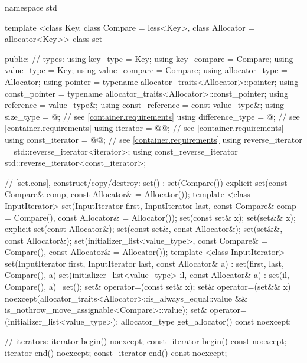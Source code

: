 \begin{codeblock}
namespace std {
  template <class Key, class Compare = less<Key>,
            class Allocator = allocator<Key>>
  class set {
  public:
    // types:
    using key_type               = Key;
    using key_compare            = Compare;
    using value_type             = Key;
    using value_compare          = Compare;
    using allocator_type         = Allocator;
    using pointer                = typename allocator_traits<Allocator>::pointer;
    using const_pointer          = typename allocator_traits<Allocator>::const_pointer;
    using reference              = value_type&;
    using const_reference        = const value_type&;
    using size_type              = @\impdef@; // see \ref{container.requirements}
    using difference_type        = @\impdef@; // see \ref{container.requirements}
    using iterator               = @@; // see \ref{container.requirements}
    using const_iterator         = @@; // see \ref{container.requirements}
    using reverse_iterator       = std::reverse_iterator<iterator>;
    using const_reverse_iterator = std::reverse_iterator<const_iterator>;

    // \ref{set.cons}, construct/copy/destroy:
    set() : set(Compare()) { }
    explicit set(const Compare& comp, const Allocator& = Allocator());
    template <class InputIterator>
      set(InputIterator first, InputIterator last,
          const Compare& comp = Compare(), const Allocator& = Allocator());
    set(const set& x);
    set(set&& x);
    explicit set(const Allocator&);
    set(const set&, const Allocator&);
    set(set&&, const Allocator&);
    set(initializer_list<value_type>, const Compare& = Compare(),
        const Allocator& = Allocator());
    template <class InputIterator>
      set(InputIterator first, InputIterator last, const Allocator& a)
        : set(first, last, Compare(), a) { }
    set(initializer_list<value_type> il, const Allocator& a)
      : set(il, Compare(), a) { }
    ~set();
    set& operator=(const set& x);
    set& operator=(set&& x)
      noexcept(allocator_traits<Allocator>::is_always_equal::value &&
               is_nothrow_move_assignable<Compare>::value);
    set& operator=(initializer_list<value_type>);
    allocator_type get_allocator() const noexcept;

    // iterators:
    iterator               begin() noexcept;
    const_iterator         begin() const noexcept;
    iterator               end() noexcept;
    const_iterator         end() const noexcept;

}}
\end{codeblock}
